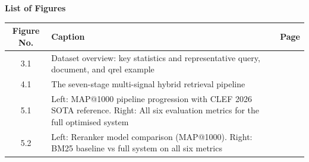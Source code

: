 \thispagestyle{plain}
\begin{center}
    \Large \textbf{List of Figures}
\end{center}

\vspace{1em}

\begin{center}
\begin{tabular}{|c|p{9.5cm}|c|}
\hline
\textbf{Figure No.} & \textbf{Caption} & \textbf{Page} \\
\hline
3.1 & Dataset overview: key statistics and representative query, document, and qrel example & \pageref{fig:dataset} \\
\hline
4.1 & The seven-stage multi-signal hybrid retrieval pipeline & \pageref{fig:pipeline} \\
\hline
5.1 & Left: MAP@1000 pipeline progression with CLEF 2026 SOTA reference. Right: All six evaluation metrics for the full optimised system & \pageref{fig:results} \\
\hline
5.2 & Left: Reranker model comparison (MAP@1000). Right: BM25 baseline vs full system on all six metrics & \pageref{fig:ablation} \\
\hline
\end{tabular}
\end{center}
